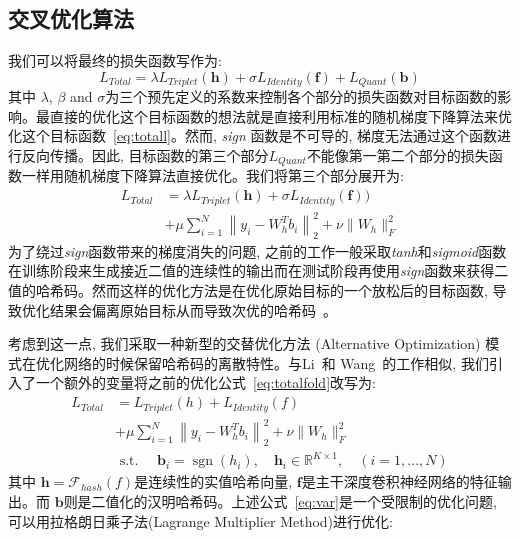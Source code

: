 \subsection{交叉优化算法}
我们可以将最终的损失函数写作为:
\begin{equation}
    L_{Total} = \lambda L_{Triplet}(\mathbf{h})  + \sigma L_{Identity}(\mathbf{f}) + L_{Quant}(\mathbf{b})
    \label{eq:totall}
\end{equation}
其中 $\lambda$, $\beta$ and $\sigma$为三个预先定义的系数来控制各个部分的损失函数对目标函数的影响。最直接的优化这个目标函数的想法就是直接利用标准的随机梯度下降算法来优化这个目标函数~\ref{eq:totall}。然而, \textit{sign} 函数是不可导的, 梯度无法通过这个函数进行反向传播。因此, 目标函数的第三个部分$L_{Quant}$不能像第一第二个部分的损失函数一样用随机梯度下降算法直接优化。我们将第三个部分展开为:
\begin{equation}
    \begin{aligned}
     L_{Total} &= \lambda L_{Triplet}(\mathbf{h})  + \sigma L_{Identity}(\mathbf{f})) \\
     &+\mu \sum_{i=1}^{N}\left\|y_{i}-W_h^{T} b_{i}\right\|_{2}^{2}+\nu\|W_h\|_{F}^{2} 
    \end{aligned}
       \label{eq:totalfold}
   \end{equation}
为了绕过\textit{sign}函数带来的梯度消失的问题, 之前的工作一般采取\textit{tanh}和\textit{sigmoid}函数在训练阶段来生成接近二值的连续性的输出而在测试阶段再使用\textit{sign}函数来获得二值的哈希码。然而这样的优化方法是在优化原始目标的一个放松后的目标函数, 导致优化结果会偏离原始目标从而导致次优的哈希码~\cite{liu2016deep}。\par
考虑到这一点, 我们采取一种新型的交替优化方法 (Alternative Optimization) 模式在优化网络的时候保留哈希码的离散特性。与Li~\cite{li2017deep}和 Wang~\cite{wang2017deep}的工作相似, 我们引入了一个额外的变量将之前的优化公式~\ref{eq:totalfold}改写为: 
\begin{equation}
    \begin{aligned}
L_{Total} &= L_{Triplet}(h) + L_{Identity}(f) \\
&+\mu \sum_{i=1}^{N}\left\|y_{i}-W_h^{T} b_{i}\right\|_{2}^{2}+\nu\|W_h\|_{F}^{2} \\
&\text { s.t. } \quad \mathbf{b}_{i}=\operatorname{sgn}\left(h_{i}\right), \quad \mathbf{h}_{i} \in \mathbb{R}^{K \times 1}, \quad(i=1, \ldots, N)
\end{aligned}
\label{eq:var}
\end{equation}
其中 $\mathbf{h} = \mathcal{F}_{hash}(f) $是连续性的实值哈希向量, $\mathbf{f}$是主干深度卷积神经网络的特征输出。而 $\mathbf{b}$则是二值化的汉明哈希码。上述公式~\ref{eq:var}是一个受限制的优化问题, 可以用拉格朗日乘子法(Lagrange Multiplier Method)进行优化:
